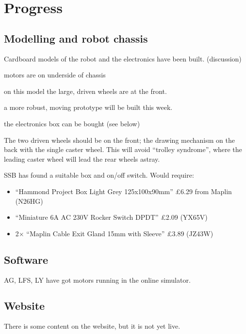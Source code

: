 \documentclass[a4paper,11pt,twoside,class=meetingmins,crop=false]{standalone}
\begin{document}
\section{Progress}
\begin{items}
    \subsection{Modelling and robot chassis}
        \item Cardboard models of the robot and the electronics have been built. (discussion)
        \begin{subitems}
            \item motors are on underside of chassis
            \item on this model the large, driven wheels are at the front.
            \item a more robust, moving prototype will be built this week.
            \item the electronics box can be bought (see below)
        \end{subitems}
        \decisions The two driven wheels should be on the front; the drawing mechanism on the back with the single caster wheel. This will avoid ``trolley syndrome'', where the leading caster wheel will lead the rear wheels astray.
        \item SSB has found a suitable box and on/off switch. Would require:
        \begin{itemize}
            \item ``Hammond Project Box Light Grey 125x100x90mm'' \pounds{6.29} from Maplin (N26HG)
            \item ``Miniature 6A AC 230V Rocker Switch DPDT'' \pounds{2.09} (YX65V)
            \item 2$\times$ ``Maplin Cable Exit Gland 15mm with Sleeve'' \pounds{3.89} (JZ43W)
        \end{itemize}

    \subsection{Software}
        \item AG, LFS, LY have got motors running in the online simulator.

    \subsection{Website}
        \item There is some content on the website, but it is not yet live.

\end{items}
\end{document}
